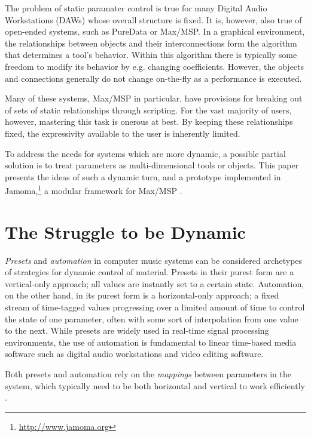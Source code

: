 \documentclass{article}
\begin{document}
The problem of static paramater control is true for many Digital Audio Workstations (DAWs) whose overall structure is fixed. It is, however, also true of open-ended systems, such as PureData or Max/MSP. In a graphical environment, the relationships between objects and their interconnections form the algorithm that determines a tool's behavior. Within this algorithm there is typically some freedom to modify its behavior by e.g. changing coefficients. However, the objects and connections generally do not change on-the-fly as a performance is executed.

Many of these systems, Max/MSP in particular, have provisions for breaking out of sets of static relationships through scripting. For the vast majority of users, however, mastering this task is onerous at best. By keeping these relationships fixed, the expressivity available to the user is inherently limited. 

To address the needs for systems which are more dynamic, a possible partial solution is to treat parameters as multi-dimensional tools or objects. This paper presents the ideas of such a dynamic turn, and a prototype implemented in Jamoma,\footnote{\url{http://www.jamoma.org}} a modular framework for Max/MSP \cite{Place:2006}. 

\section{The Struggle to be Dynamic}

\emph{Presets} and \emph{automation} in computer music systems can be considered archetypes of strategies for dynamic control of material. Presets in their purest form are a vertical-only approach; all values are instantly set to a certain state. Automation, on the other hand, in its purest form is a horizontal-only approach; a fixed stream of time-tagged values progressing over a limited amount of time to control the state of one parameter, often with some sort of interpolation from one value to the next. While presets are widely used in real-time signal processing environments, the use of automation is fundamental to linear time-based media software such as digital audio workstations and video editing software.

Both presets and automation rely on the \emph{mappings} between parameters in the system, which typically need to be both horizontal and vertical to work efficiently \cite{Hunt:2003,Nort:2006}.
\end{document}
